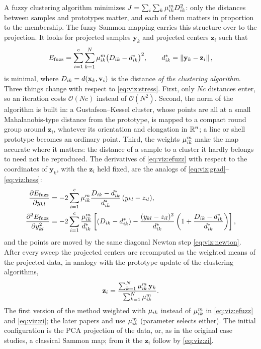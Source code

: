 A fuzzy clustering algorithm minimizes $J=\sum_i\sum_k\mu_{ik}^m D^2_{ik}$: only the distances between samples and prototypes matter, and each of them matters in proportion to the membership. The fuzzy Sammon mapping \cite{kovacs:2002:fuzzsam,abonyi:2004:fuzzsam,feil:2007:fuzzsam} carries this structure over to the projection. It looks for projected samples $\mathbf{y}_k$ and projected centers $\mathbf{z}_i$ such that
\begin{equation}
  E_\text{fuzz} = \sum_{i=1}^{c}\sum_{k=1}^{N}\mu_{ik}^m\bigl(D_{ik}-d^*_{ik}\bigr)^2,\qquad d^*_{ik}=\left\lVert \mathbf{y}_k-\mathbf{z}_i \right\rVert,
  \label{eq:viz:efuzz}
\end{equation}
is minimal, where $D_{ik}=d(\mathbf{x}_k,\mathbf{v}_i)$ is the distance \emph{of the clustering algorithm}. Three things change with respect to \eqref{eq:viz:stress}. First, only $Nc$ distances enter, so an iteration costs $\mathcal{O}(Nc)$ instead of $\mathcal{O}(N^2)$. Second, the norm of the algorithm is built in: a Gustafson--Kessel cluster, whose points are all at a small Mahalanobis-type distance from the prototype, is mapped to a compact round group around $\mathbf{z}_i$, whatever its orientation and elongation in $\mathbb{R}^n$; a line or shell prototype becomes an ordinary point. Third, the weights $\mu_{ik}^m$ make the map accurate where it matters: the distance of a sample to a cluster it hardly belongs to need not be reproduced. The derivatives of \eqref{eq:viz:efuzz} with respect to the coordinates of $\mathbf{y}_k$, with the $\mathbf{z}_i$ held fixed, are the analogs of \eqref{eq:viz:grad}--\eqref{eq:viz:hess}:
\begin{align}
  \frac{\partial E_\text{fuzz}}{\partial y_{kl}} &= -2\sum_{i=1}^{c}\mu_{ik}^m\frac{D_{ik}-d^*_{ik}}{d^*_{ik}}\,(y_{kl}-z_{il}),\label{eq:viz:fgrad}\\
  \frac{\partial^2E_\text{fuzz}}{\partial y_{kl}^2} &= -2\sum_{i=1}^{c}\frac{\mu_{ik}^m}{d^*_{ik}}\left[(D_{ik}-d^*_{ik})-\frac{(y_{kl}-z_{il})^2}{d^*_{ik}}\left(1+\frac{D_{ik}-d^*_{ik}}{d^*_{ik}}\right)\right],\label{eq:viz:fhess}
\end{align}
and the points are moved by the same diagonal Newton step \eqref{eq:viz:newton}. After every sweep the projected centers are recomputed as the weighted means of the projected data, in analogy with the prototype update of the clustering algorithms,
\begin{equation}
  \mathbf{z}_i = \frac{\sum_{k=1}^{N}\mu_{ik}^m\,\mathbf{y}_k}{\sum_{k=1}^{N}\mu_{ik}^m}.
  \label{eq:viz:zi}
\end{equation}
The first version of the method \cite{kovacs:2002:fuzzsam} weighted with $\mu_{ik}$ instead of $\mu_{ik}^m$ in \eqref{eq:viz:efuzz} and \eqref{eq:viz:zi}; the later papers and  use $\mu_{ik}^m$ (parameter  selects either). The initial configuration is the PCA projection of the data, or, as in the original case studies, a classical Sammon map; from it the $\mathbf{z}_i$ follow by \eqref{eq:viz:zi}.

